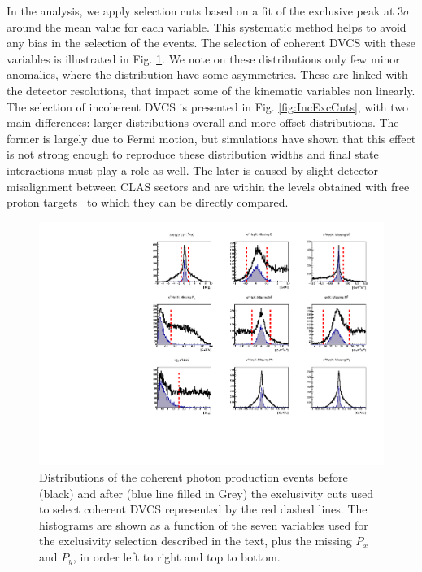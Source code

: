 \documentclass[aps,prc,preprint,superscriptaddress]{revtex4}
\begin{document}
In the analysis, we apply selection cuts based on a fit of the exclusive peak at 3$\sigma$ around 
the mean value for each variable. This systematic method helps to avoid any bias 
in the selection of the events. The selection of coherent DVCS with these variables is illustrated in 
Fig. \ref{fig:CohExcCuts}. We note on these distributions only few minor anomalies, where the 
distribution have some asymmetries. These are linked with the detector resolutions, that impact
some of the kinematic variables non linearly. The selection of incoherent DVCS is presented in 
Fig. \ref{fig:IncExcCuts}, with two main differences: larger distributions overall and more
offset distributions. The former is largely due to Fermi motion, but simulations have shown
that this effect is not strong enough to reproduce these distribution widths and final 
state interactions must play a role as well. The later is caused by slight detector 
misalignment between CLAS sectors and are within the levels obtained with free proton 
targets~\cite{HirlingerSaylor:2018bnu} to which they can be directly compared. 

\begin{figure}[tbp!]
\center
\includegraphics[trim=20 10 20 5,clip,width=15cm]{fig3/all_coh_exc_cuts.pdf}
	\caption{Distributions of the coherent photon production events before 
	(black) and after (blue line filled
	in Grey) the exclusivity cuts used to select coherent DVCS represented by the 
	red dashed lines. The histograms are shown as a function of the 
	seven variables used for the exclusivity selection described in the text, 
	plus the missing $P_x$ and $P_y$, in order left to right and top to bottom. 
	}
\label{fig:CohExcCuts}
\end{figure}
\end{document}
